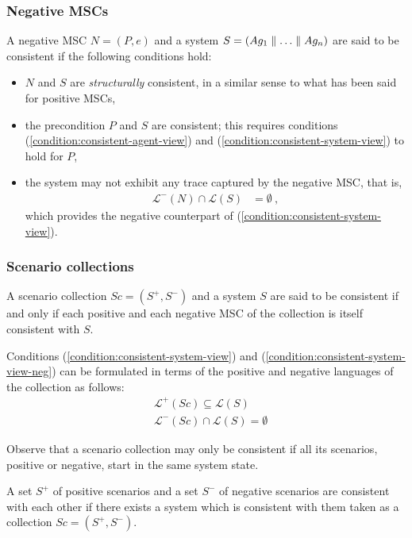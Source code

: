 \subsubsection*{Negative MSCs}

A negative MSC $N = (P,e)$ and a system $S = (Ag_1 \parallel \ldots \parallel Ag_n)$ are said to be consistent if the following conditions hold:

\begin{itemize}
\item $N$ and $S$ are \emph{structurally} consistent, in a similar sense to what has been said for positive MSCs,

\item the precondition $P$ and $S$ are consistent; this requires conditions (\ref{condition:consistent-agent-view}) and (\ref{condition:consistent-system-view}) to hold for $P$,

\item the system may not exhibit any trace captured by the negative MSC, that is,
\begin{align}\mathcal{L}^{-}(N) \cap \mathcal{L}(S) &= \emptyset~,\label{condition:consistent-system-view-neg}\end{align}
which provides the negative counterpart of (\ref{condition:consistent-system-view}).
\end{itemize}

\subsubsection*{Scenario collections}

A scenario collection $Sc = (S^+,S^-)$ and a system $S$ are said to be consistent if and only if each positive and each negative MSC of the collection is itself consistent with $S$. 

Conditions (\ref{condition:consistent-system-view}) and (\ref{condition:consistent-system-view-neg}) can be formulated in terms of the positive and negative languages of the collection as follows:
\begin{align}
&\mathcal{L}^+(Sc) \subseteq \mathcal{L}(S) \\
&\mathcal{L}^-(Sc) \cap \mathcal{L}(S) = \emptyset
\end{align}

Observe that a scenario collection may only be consistent if all its scenarios, positive or negative, start in the same system state.

A set $S^+$ of positive scenarios and a set $S^-$ of negative scenarios are consistent with each other if there exists a system which is consistent with them taken as a collection $Sc = (S^+,S^-)$. 

